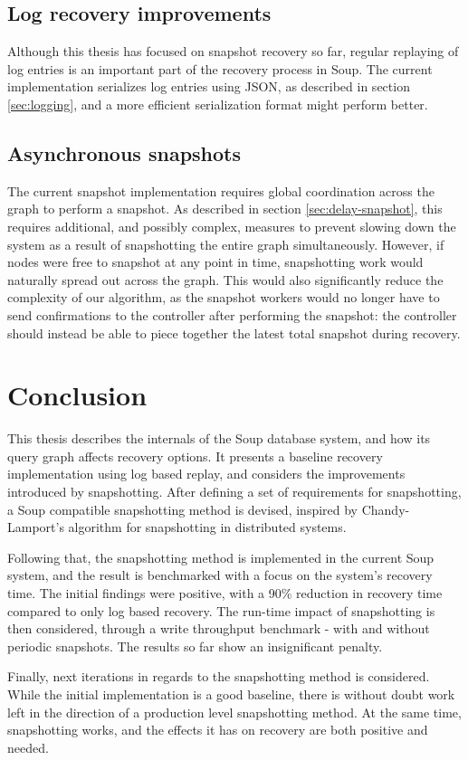 \documentclass[b5paper]{report}
\begin{document}
\subsection{Log recovery improvements}
Although this thesis has focused on snapshot recovery so far, regular replaying
of log entries is an important part of the recovery process in Soup. The current
implementation serializes log entries using JSON, as described in section
\ref{sec:logging}, and a more efficient serialization format might perform
better.

\subsection{Asynchronous snapshots}
The current snapshot implementation requires global coordination across the
graph to perform a snapshot. As described in section \ref{sec:delay-snapshot},
this requires additional, and possibly complex, measures to prevent slowing down
the system as a result of snapshotting the entire graph simultaneously. However,
if nodes were free to snapshot at any point in time, snapshotting work would
naturally spread out across the graph. This would also significantly reduce the
complexity of our algorithm, as the snapshot workers would no longer have to
send confirmations to the controller after performing the snapshot: the
controller should instead be able to piece together the latest total snapshot
during recovery.

\section{Conclusion}
This thesis describes the internals of the Soup database system, and how its
query graph affects recovery options. It presents a baseline recovery
implementation using log based replay, and considers the improvements introduced
by snapshotting. After defining a set of requirements for snapshotting, a Soup
compatible snapshotting method is devised, inspired by Chandy-Lamport's
algorithm for snapshotting in distributed systems.

Following that, the snapshotting method is implemented in the current Soup
system, and the result is benchmarked with a focus on the system's recovery
time. The initial findings were positive, with a 90\% reduction in recovery
time compared to only log based recovery. The run-time impact of snapshotting is
then considered, through a write throughput benchmark - with and without
periodic snapshots. The results so far show an insignificant penalty.

Finally, next iterations in regards to the snapshotting method is considered.
While the initial implementation is a good baseline, there is without doubt work
left in the direction of a production level snapshotting method. At the same
time, snapshotting works, and the effects it has on recovery are both positive
and needed.



\end{document}
